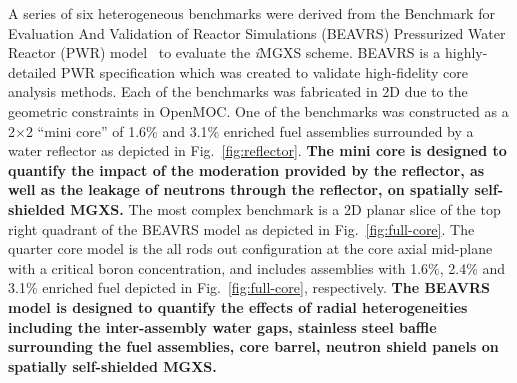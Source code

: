 \documentclass[12pt,twoside]{mitthesis-exec}
\begin{document}
A series of six heterogeneous benchmarks were derived from the Benchmark for Evaluation And Validation of Reactor Simulations (BEAVRS) Pressurized Water Reactor (PWR) model~\cite{horelik2013beavrs} to evaluate the \textit{i}MGXS scheme. BEAVRS is a highly-detailed PWR specification which was created to validate high-fidelity core analysis methods. Each of the benchmarks was fabricated in 2D due to the geometric constraints in OpenMOC. One of the benchmarks was constructed as a 2$\times$2 ``mini core'' of 1.6\% and 3.1\% enriched fuel assemblies surrounded by a water reflector as depicted in Fig.~\ref{fig:reflector}. \textbf{The mini core is designed to quantify the impact of the moderation provided by the reflector, as well as the leakage of neutrons through the reflector, on spatially self-shielded MGXS.} The most complex benchmark is a 2D planar slice of the top right quadrant of the BEAVRS model as depicted in Fig.~\ref{fig:full-core}. The quarter core model is the all rods out configuration at the core axial mid-plane with a critical boron concentration, and includes assemblies with 1.6\%, 2.4\% and 3.1\% enriched fuel depicted in Fig.~\ref{fig:full-core}, respectively. \textbf{The BEAVRS model is designed to quantify the effects of radial heterogeneities including the inter-assembly water gaps, stainless steel baffle surrounding the fuel assemblies, core barrel, neutron shield panels on spatially self-shielded MGXS.} 



 

\end{document}

